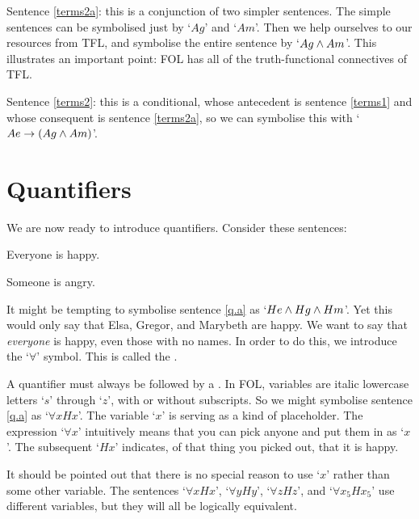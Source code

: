 Sentence \ref{terms2a}: this is a conjunction of two simpler sentences. The simple sentences can be symbolised just by `$Ag$' and `$Am$'. Then we help ourselves to our resources from TFL, and symbolise the entire sentence by `$Ag \wedge Am$'. This illustrates an important point: FOL has all of the truth-functional connectives of TFL.

Sentence \ref{terms2}: this is a conditional, whose antecedent is sentence \ref{terms1} and whose consequent is sentence \ref{terms2a}, so we can symbolise this with `$Ae \rightarrow (Ag \wedge Am)$'.

\section{Quantifiers}
We are now ready to introduce quantifiers. Consider these sentences:
	\begin{earg}
		\item[\ex{q.a}] Everyone is happy.
		\item[\ex{q.e}] Someone is angry.
	\end{earg}
It might be tempting to symbolise sentence \ref{q.a} as `$He \wedge Hg \wedge Hm$'. Yet this would only say that Elsa, Gregor, and Marybeth are happy. We want to say that \emph{everyone} is happy, even those with no names. In order to do this, we introduce the `$\forall$' symbol. This is called the .


A quantifier must always be followed by a . In FOL, variables are italic lowercase letters `$s$' through `$z$', with or without subscripts. So we might symbolise sentence \ref{q.a} as `$\forall x Hx$'.  The variable `$x$' is serving as a kind of placeholder. The expression `$\forall x$' intuitively means that you can pick anyone and put them in as `$x$'. The subsequent `$Hx$' indicates, of that thing you picked out, that it is happy. 



It should be pointed out that there is no special reason to use `$x$' rather than some other variable. The sentences `$\forall x Hx$', `$\forall y Hy$', `$\forall z Hz$', and `$\forall x_5 Hx_5$' use different variables, but they will all be logically equivalent.

